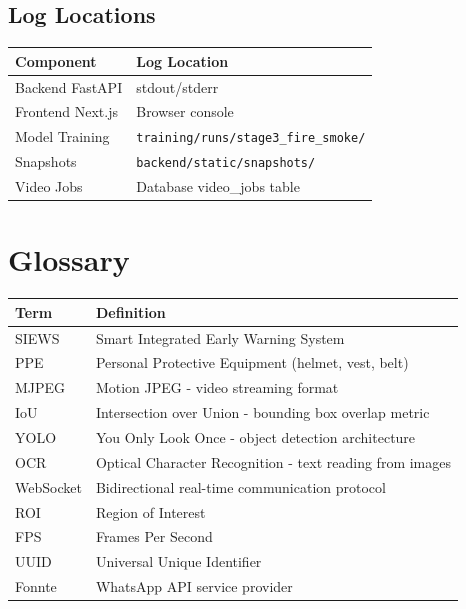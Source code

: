 \documentclass[12pt,a4paper,oneside]{book}
\begin{document}
\section{Log Locations}

\begin{tabular}{|l|l|}
    \hline
    \textbf{Component} & \textbf{Log Location} \\
    \hline
    Backend FastAPI & stdout/stderr \\
    \hline
    Frontend Next.js & Browser console \\
    \hline
    Model Training & \texttt{training/runs/stage3\_fire\_smoke/} \\
    \hline
    Snapshots & \texttt{backend/static/snapshots/} \\
    \hline
    Video Jobs & Database video\_jobs table \\
    \hline
\end{tabular}

\appendix

\chapter{Glossary}

\begin{tabular}{|l|p{10cm}|}
    \hline
    \textbf{Term} & \textbf{Definition} \\
    \hline
    SIEWS & Smart Integrated Early Warning System \\
    \hline
    PPE & Personal Protective Equipment (helmet, vest, belt) \\
    \hline
    MJPEG & Motion JPEG - video streaming format \\
    \hline
    IoU & Intersection over Union - bounding box overlap metric \\
    \hline
    YOLO & You Only Look Once - object detection architecture \\
    \hline
    OCR & Optical Character Recognition - text reading from images \\
    \hline
    WebSocket & Bidirectional real-time communication protocol \\
    \hline
    ROI & Region of Interest \\
    \hline
    FPS & Frames Per Second \\
    \hline
    UUID & Universal Unique Identifier \\
    \hline
    Fonnte & WhatsApp API service provider \\
    \hline
\end{tabular}
\end{document}

